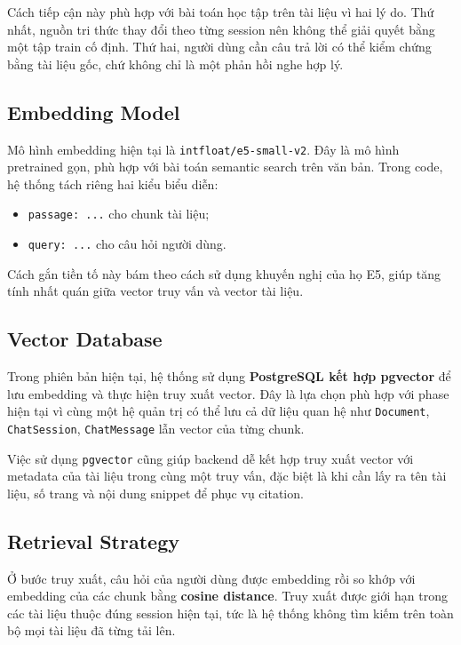 \documentclass[12pt]{ai_conquer2026}
\begin{document}
Cách tiếp cận này phù hợp với bài toán học tập trên tài liệu vì hai lý do. Thứ nhất, nguồn tri thức thay đổi theo từng session nên không thể giải quyết bằng một tập train cố định. Thứ hai, người dùng cần câu trả lời có thể kiểm chứng bằng tài liệu gốc, chứ không chỉ là một phản hồi nghe hợp lý.

\subsection{Embedding Model}

Mô hình embedding hiện tại là \texttt{intfloat/e5-small-v2}. Đây là mô hình pretrained gọn, phù hợp với bài toán semantic search trên văn bản. Trong code, hệ thống tách riêng hai kiểu biểu diễn:

\begin{itemize}
    \item \texttt{passage: ...} cho chunk tài liệu;
    \item \texttt{query: ...} cho câu hỏi người dùng.
\end{itemize}

Cách gắn tiền tố này bám theo cách sử dụng khuyến nghị của họ E5, giúp tăng tính nhất quán giữa vector truy vấn và vector tài liệu.

\subsection{Vector Database}

Trong phiên bản hiện tại, hệ thống sử dụng \textbf{PostgreSQL kết hợp pgvector} để lưu embedding và thực hiện truy xuất vector. Đây là lựa chọn phù hợp với phase hiện tại vì cùng một hệ quản trị có thể lưu cả dữ liệu quan hệ như \texttt{Document}, \texttt{ChatSession}, \texttt{ChatMessage} lẫn vector của từng chunk.

Việc sử dụng \texttt{pgvector} cũng giúp backend dễ kết hợp truy xuất vector với metadata của tài liệu trong cùng một truy vấn, đặc biệt là khi cần lấy ra tên tài liệu, số trang và nội dung snippet để phục vụ citation.

\subsection{Retrieval Strategy}

Ở bước truy xuất, câu hỏi của người dùng được embedding rồi so khớp với embedding của các chunk bằng \textbf{cosine distance}. Truy xuất được giới hạn trong các tài liệu thuộc đúng session hiện tại, tức là hệ thống không tìm kiếm trên toàn bộ mọi tài liệu đã từng tải lên.
\end{document}
